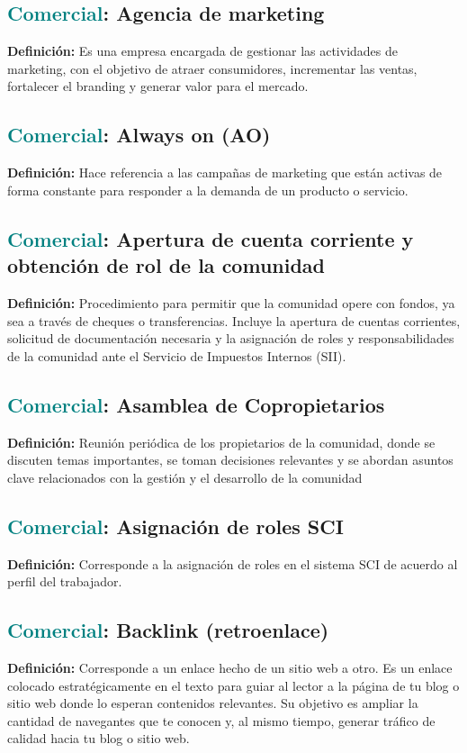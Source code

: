 \documentclass[12pt]{article}
\begin{document}
\subsection{\textcolor{teal}{Comercial}: Agencia de marketing}
\textbf{Definición:} Es una empresa encargada de gestionar las actividades de marketing, con el objetivo de atraer consumidores, incrementar las ventas, fortalecer el branding y generar valor para el mercado.
\subsection{\textcolor{teal}{Comercial}: Always on (AO)}
\textbf{Definición:} Hace referencia a las campañas de marketing que están activas de forma constante para responder a la demanda de un producto o servicio.
\subsection{\textcolor{teal}{Comercial}: Apertura de cuenta corriente y obtención de rol de la comunidad}
\textbf{Definición:} Procedimiento para permitir que la comunidad opere con fondos, ya sea a través de cheques o transferencias. Incluye la apertura de cuentas corrientes, solicitud de documentación necesaria y la asignación de roles y responsabilidades de la comunidad ante el Servicio de Impuestos Internos (SII).
\subsection{\textcolor{teal}{Comercial}: Asamblea de Copropietarios}
\textbf{Definición:} Reunión periódica de los propietarios de la comunidad, donde se discuten temas importantes, se toman decisiones relevantes y se abordan asuntos clave relacionados con la gestión y el desarrollo de la comunidad
\subsection{\textcolor{teal}{Comercial}: Asignación de roles SCI}
\textbf{Definición:} Corresponde a la asignación de roles en el sistema SCI de acuerdo al perfil del trabajador.
\subsection{\textcolor{teal}{Comercial}: Backlink (retroenlace)}
\textbf{Definición:} Corresponde a un enlace hecho de un sitio web a otro. Es un enlace colocado estratégicamente en el texto para guiar al lector a la página de tu blog o sitio web donde lo esperan contenidos relevantes. Su objetivo es ampliar la cantidad de navegantes que te conocen y, al mismo tiempo, generar tráfico de calidad hacia tu blog o sitio web. 
\end{document}
